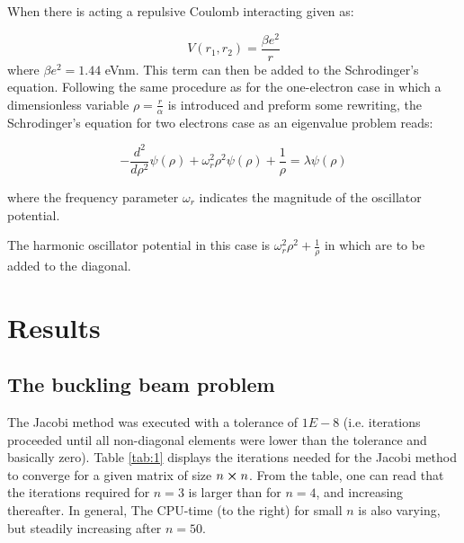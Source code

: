 \documentclass{article}
\begin{document}
\medskip

When there is acting a repulsive Coulomb interacting given as:

\begin{equation}
V(r_1,r_2) = \frac{\beta e^2}{r}
\end{equation}
where $ \beta e^2 = 1.44$ eVnm.
This term can then be added to the Schrodinger's equation. Following the same procedure as for the one-electron case in which a dimensionless variable $\rho = \frac{r}{\alpha}$ is introduced and preform some rewriting, the Schrodinger's equation for two electrons case as an eigenvalue problem reads:

\begin{equation}
    -\frac{d^2}{d\rho^2}\psi(\rho) + \omega_{r}^2\rho^2\psi(\rho) + \frac{1}{\rho} = \lambda\psi(\rho)
\end{equation}

where the frequency parameter $\omega_r{}$ indicates the magnitude of the oscillator potential. 

\medskip

The harmonic oscillator potential in this case is $\omega_r^2\rho^2 + \frac{1}{\rho}$ in which are to be added to the diagonal. 

\medskip 


\section{Results}\label{sec:res}

\subsection{The buckling beam problem}\label{sec:bbp}

The Jacobi method was executed with a tolerance of $1E-8$ (i.e. iterations proceeded until all non-diagonal elements were lower than the tolerance and basically zero). Table \ref{tab:1} displays the iterations needed for the Jacobi method to converge for a given matrix of size $n\cross n$.  From the table, one can read that the iterations required for $n = 3$ is larger than for $n = 4$, and increasing thereafter. In general, The CPU-time (to the right) for small $n$ is also varying, but steadily increasing after $n = 50$.
\end{document}
